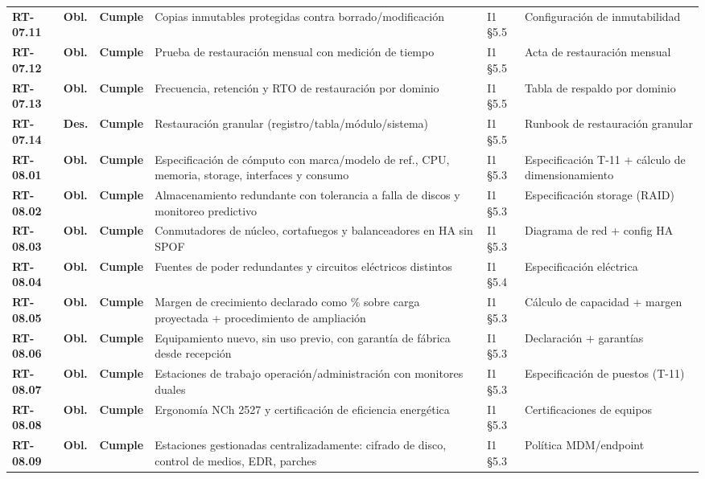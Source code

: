 \begin{small}
\begin{longtable}{@{}p{1.35cm} p{1.15cm} p{1.15cm} p{4.6cm} p{2.35cm} p{3.8cm}@{}}
\textbf{RT-07.11} & \textbf{Obl.} & \textbf{Cumple} & Copias inmutables protegidas contra borrado/modificaci\'on & I1 §5.5 & Configuraci\'on de inmutabilidad \\
\textbf{RT-07.12} & \textbf{Obl.} & \textbf{Cumple} & Prueba de restauraci\'on mensual con medici\'on de tiempo & I1 §5.5 & Acta de restauraci\'on mensual \\
\textbf{RT-07.13} & \textbf{Obl.} & \textbf{Cumple} & Frecuencia, retenci\'on y RTO de restauraci\'on por dominio & I1 §5.5 & Tabla de respaldo por dominio \\
\textbf{RT-07.14} & \textbf{Des.} & \textbf{Cumple} & Restauraci\'on granular (registro/tabla/m\'odulo/sistema) & I1 §5.5 & Runbook de restauraci\'on granular \\
\textbf{RT-08.01} & \textbf{Obl.} & \textbf{Cumple} & Especificaci\'on de c\'omputo con marca/modelo de ref., CPU, memoria, storage, interfaces y consumo & I1 §5.3 & Especificaci\'on T-11 + c\'alculo de dimensionamiento \\
\textbf{RT-08.02} & \textbf{Obl.} & \textbf{Cumple} & Almacenamiento redundante con tolerancia a falla de discos y monitoreo predictivo & I1 §5.3 & Especificaci\'on storage (RAID) \\
\textbf{RT-08.03} & \textbf{Obl.} & \textbf{Cumple} & Conmutadores de n\'ucleo, cortafuegos y balanceadores en HA sin SPOF & I1 §5.3 & Diagrama de red + config HA \\
\textbf{RT-08.04} & \textbf{Obl.} & \textbf{Cumple} & Fuentes de poder redundantes y circuitos el\'ectricos distintos & I1 §5.4 & Especificaci\'on el\'ectrica \\
\textbf{RT-08.05} & \textbf{Obl.} & \textbf{Cumple} & Margen de crecimiento declarado como \% sobre carga proyectada + procedimiento de ampliaci\'on & I1 §5.3 & C\'alculo de capacidad + margen \\
\textbf{RT-08.06} & \textbf{Obl.} & \textbf{Cumple} & Equipamiento nuevo, sin uso previo, con garant\'ia de f\'abrica desde recepci\'on & I1 §5.3 & Declaraci\'on + garant\'ias \\
\textbf{RT-08.07} & \textbf{Obl.} & \textbf{Cumple} & Estaciones de trabajo operaci\'on/administraci\'on con monitores duales & I1 §5.3 & Especificaci\'on de puestos (T-11) \\
\textbf{RT-08.08} & \textbf{Obl.} & \textbf{Cumple} & Ergonom\'ia NCh 2527 y certificaci\'on de eficiencia energ\'etica & I1 §5.3 & Certificaciones de equipos \\
\textbf{RT-08.09} & \textbf{Obl.} & \textbf{Cumple} & Estaciones gestionadas centralizadamente: cifrado de disco, control de medios, EDR, parches & I1 §5.3 & Pol\'itica MDM/endpoint \\

\end{longtable}
\end{small}
